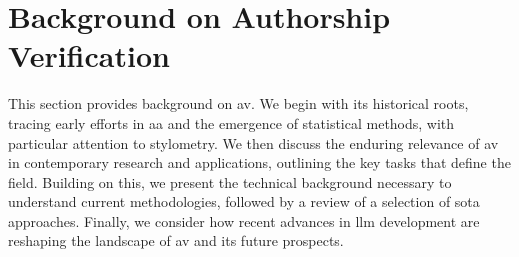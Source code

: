 \chapter{Background on Authorship Verification}
\label{chap:authorship_identification}

This section provides background on \ac{av}. 
We begin with its historical roots, tracing early efforts in \ac{aa} and the emergence of statistical methods, with particular attention to stylometry. 
We then discuss the enduring relevance of \ac{av} in contemporary research and applications, outlining the key tasks that define the field. 
Building on this, we present the technical background necessary to understand current methodologies, followed by a review of a selection of \acl{sota} approaches. 
Finally, we consider how recent advances in \ac{llm} development are reshaping the landscape of \ac{av} and its future prospects.










% 



